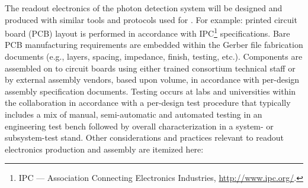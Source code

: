 The readout electronics of the photon detection system will be designed and produced with similar tools and protocols used for  . For example: printed circuit board (PCB) layout is performed in accordance with IPC\footnote{IPC\texttrademark{} — Association Connecting Electronics Industries, \url{http://www.ipc.org/}.} specifications. Bare PCB manufacturing requirements are embedded within the Gerber file fabrication documents (e.g., layers, spacing, impedance, finish, testing, etc.). Components are assembled on to circuit boards using either trained  consortium technical staff or by external assembly vendors, based upon volume, in accordance with per-design assembly specification documents. Testing occurs at labs and universities within the collaboration in accordance with a per-design test procedure that typically includes a mix of manual, semi-automatic and automated testing in an engineering test bench followed by overall characterization in a system- or subsystem-test stand.
Other considerations and practices relevant to readout electronics production and assembly are itemized here:

